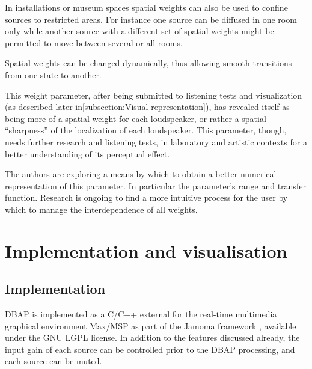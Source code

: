 \documentclass[twoside,10pt]{article}
\begin{document}
In installations or museum spaces spatial weights can also be used to confine sources to restricted areas. For instance one source can be diffused in one room only while another source with a different set of spatial weights might be permitted to move between several or all rooms.

Spatial weights can be changed dynamically, thus allowing smooth transitions from one state to another. 

This weight parameter, after being submitted to listening tests and visualization (as described later in\ref{subsection:Visual representation}), has revealed itself as being more of a spatial weight for each loudspeaker, or rather a spatial ``sharpness'' of the localization of each loudspeaker. This parameter, though, needs further research and listening tests, in laboratory and artistic contexts for a better understanding of its perceptual effect.

The authors are exploring a means by which to obtain a better numerical representation of this parameter.  In particular the parameter's range and transfer function. Research is ongoing to find a more intuitive process for the user by which to manage the interdependence of all weights.



%
%

\section{Implementation and visualisation}

\subsection{Implementation}

DBAP is implemented as a C/C++ external for the real-time multimedia graphical environment Max/MSP \cite{Puckette:1988patcher, Zicarelli:1998} as part of the Jamoma framework \cite{Place:2006jamoma}, available under the GNU LGPL license. In addition to the features discussed already, the input gain of each source can be controlled prior to the DBAP processing, and each source can be muted.
\end{document}
